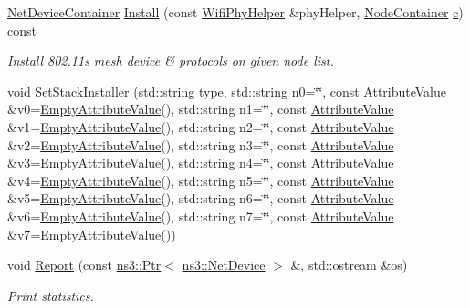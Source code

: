 \begin{DoxyCompactItemize}
\hyperlink{classns3_1_1NetDeviceContainer}{Net\+Device\+Container} \hyperlink{classns3_1_1MeshHelper_a7b33f6ca7b6842b3def4479bc7526f2c}{Install} (const \hyperlink{classns3_1_1WifiPhyHelper}{Wifi\+Phy\+Helper} \&phy\+Helper, \hyperlink{classns3_1_1NodeContainer}{Node\+Container} \hyperlink{mmwave_2model_2fading-traces_2fading__trace__generator_8m_ae0323a9039add2978bf5b49550572c7c}{c}) const 
\begin{DoxyCompactList}\small\item\em Install 802.\+11s mesh device \& protocols on given node list. \end{DoxyCompactList}\item 
void \hyperlink{classns3_1_1MeshHelper_ac1074aff829d0cde1659bdef572880ca}{Set\+Stack\+Installer} (std\+::string \hyperlink{visualizer-ideas_8txt_add98db9e15e2a58cf2b57623e7aa893a}{type}, std\+::string n0=\char`\"{}\char`\"{}, const \hyperlink{classns3_1_1AttributeValue}{Attribute\+Value} \&v0=\hyperlink{classns3_1_1EmptyAttributeValue}{Empty\+Attribute\+Value}(), std\+::string n1=\char`\"{}\char`\"{}, const \hyperlink{classns3_1_1AttributeValue}{Attribute\+Value} \&v1=\hyperlink{classns3_1_1EmptyAttributeValue}{Empty\+Attribute\+Value}(), std\+::string n2=\char`\"{}\char`\"{}, const \hyperlink{classns3_1_1AttributeValue}{Attribute\+Value} \&v2=\hyperlink{classns3_1_1EmptyAttributeValue}{Empty\+Attribute\+Value}(), std\+::string n3=\char`\"{}\char`\"{}, const \hyperlink{classns3_1_1AttributeValue}{Attribute\+Value} \&v3=\hyperlink{classns3_1_1EmptyAttributeValue}{Empty\+Attribute\+Value}(), std\+::string n4=\char`\"{}\char`\"{}, const \hyperlink{classns3_1_1AttributeValue}{Attribute\+Value} \&v4=\hyperlink{classns3_1_1EmptyAttributeValue}{Empty\+Attribute\+Value}(), std\+::string n5=\char`\"{}\char`\"{}, const \hyperlink{classns3_1_1AttributeValue}{Attribute\+Value} \&v5=\hyperlink{classns3_1_1EmptyAttributeValue}{Empty\+Attribute\+Value}(), std\+::string n6=\char`\"{}\char`\"{}, const \hyperlink{classns3_1_1AttributeValue}{Attribute\+Value} \&v6=\hyperlink{classns3_1_1EmptyAttributeValue}{Empty\+Attribute\+Value}(), std\+::string n7=\char`\"{}\char`\"{}, const \hyperlink{classns3_1_1AttributeValue}{Attribute\+Value} \&v7=\hyperlink{classns3_1_1EmptyAttributeValue}{Empty\+Attribute\+Value}())
\item 
void \hyperlink{classns3_1_1MeshHelper_ac4d379a4a0b38ec3b3984ee93de0095b}{Report} (const \hyperlink{classns3_1_1Ptr}{ns3\+::\+Ptr}$<$ \hyperlink{classns3_1_1NetDevice}{ns3\+::\+Net\+Device} $>$ \&, std\+::ostream \&os)
\begin{DoxyCompactList}\small\item\em Print statistics. \end{DoxyCompactList}\item 

\end{DoxyCompactItemize}
